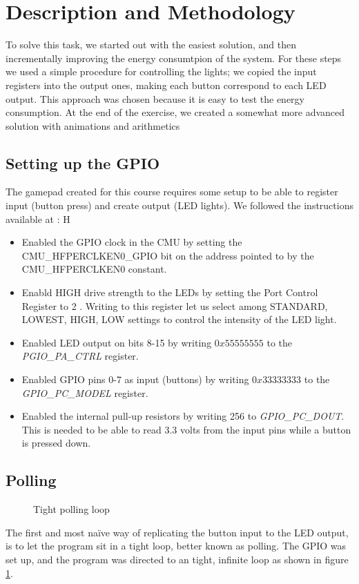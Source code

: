 \section{Description and Methodology}
\label{section:description_and_methodology}
To solve this task, we started out with the easiest solution, and then incrementally improving the energy consumtpion of the system. For these steps we used a simple procedure for controlling the lights; we copied the input registers into the output ones, making each button correspond to each LED output. This approach was chosen because it is easy to test the energy consumption. At the end of the exercise, we created a somewhat more advanced solution with animations and arithmetics

	\subsection{Setting up the GPIO}
	\label{subsection:gpio_setup}
	The gamepad created for this course requires some setup to be able to register input (button press) and create output (LED lights). We followed the instructions available at \cite[p. 24]{compendium}:
H
	\begin{itemize}
		\item Enabled the GPIO clock in the CMU by setting the CMU\_HFPERCLKEN0\_GPIO bit on the address pointed to by the CMU\_HFPERCLKEN0 constant.
		\item Enabld HIGH drive strength to the LEDs by setting the Port Control Register to 2 \cite[p. 766]{reference_manual}. Writing to this register let us select among STANDARD, LOWEST, HIGH, LOW settings to control the intensity of the LED light.
		\item Enabled LED output on bits 8-15 by writing $0x55555555$ to the \emph{PGIO\_PA\_CTRL} register.
		\item Enabled GPIO pins 0-7 as input (buttons) by writing $0x33333333$ to the \emph{GPIO\_PC\_MODEL} register.
		\item Enabled the internal pull-up resistors by writing 256 to \emph{GPIO\_PC\_DOUT}. This is needed to be able to read 3.3 volts from the input pins while a button is pressed down.
	\end{itemize}

	\subsection{Polling}
	\label{subsection:polling}
	\begin{figure}[h]
		
		\caption{Tight polling loop}
		\label{code:polling_loop}
	\end{figure}
	The first and most naïve way of replicating the button input to the LED output, is to let the program sit in a tight loop, better known as polling. The GPIO was set up, and the program was directed to an tight, infinite loop as shown in figure \ref{code:polling_loop}.

